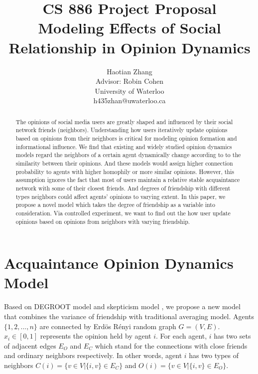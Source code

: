 \documentclass[11pt]{article}
\title{CS 886 Project Proposal\\Modeling Effects of Social Relationship in Opinion Dynamics}
\author{Haotian Zhang\\Advisor: Robin Cohen\\University of Waterloo\\h435zhan@uwaterloo.ca}
\date{}
\theoremstyle{definition}
\theoremstyle{basic}
\begin{document}
\maketitle

\begin{abstract}
The opinions of social media users are greatly shaped and influenced
by their social network friends (neighbors). Understanding how users
iteratively update opinions based on opinions from their neighbors 
is critical for modeling opinion formation and informational influence.
We find that existing and widely studied opinion dynamics models
regard the neighbors of a certain agent dynamically change according to
to the similarity between their opinions. And these models would
assign higher connection probability to agents with higher homophily
or more similar opinions.
However, this assumption
ignores the fact that most of users maintain a relative stable acquaintance
network with some of their closest friends. And degrees of friendship with
different types neighbors could affect agents' opinions to varying extent. In this
paper, we propose a novel model which takes the degree of friendship as 
a variable into consideration. Via controlled experiment,
we want to find out the how user update opinions based on opinions from
neighbors with varying friendship.

\end{abstract}


\section{Acquaintance Opinion Dynamics Model}
Based on DEGROOT model \cite{das2014modeling} and skepticism model \cite{tsang2014opinion}, we propose a new model that combines the variance of friendship with traditional averaging model. Agents $\{1,2,...,n\}$ are connected by Erd\"{o}s R\'{e}nyi random graph $G=(V,E)$. $x_i \in [0,1]$ represents the opinion held by agent $i$. For each agent, $i$ has two sets of adjacent edges $E_O$ and $E_C$ which stand for the connections with close friends and ordinary neighbors respectively. In other words, agent $i$ has two types of neighbors $C(i)=\{v \in V|\{i,v\}\in E_C\}$ and $O(i)=\{v \in V|\{i,v\}\in E_O\}$. 
\end{document}
